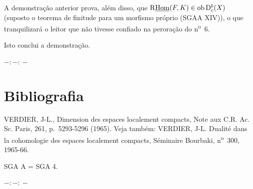 A demonstração anterior prova, além disso, que $\mathrm{R}\underline{\operatorname{Hom}}(F,K)\in\operatorname{ob}\mathrm{D}_c^b(X)$ (suposto o teorema de finitude para um morfismo próprio (SGAA XIV)), o que tranquilizará o leitor que não tivesse confiado na peroração do n\textsuperscript{o}~6.

Isto conclui a demonstração.

\begin{center}
$-:\!-:\!-$
\end{center}

\section*{Bibliografia}

\begin{enumerate}[label={[\arabic*]}]
\item VERDIER, J-L., Dimension des espaces localement compacts, Note aux C.R. Ac. Sc. Paris, 261, p.~5293-5296 (1965). Veja também: VERDIER, J-L. Dualité dans la cohomologie des espaces localement compacts, Séminaire Bourbaki, n\textsuperscript{o}~300, 1965-66.
\end{enumerate}

SGA A = SGA 4.

\begin{center}
$-:\!-:\!-$
\end{center}
